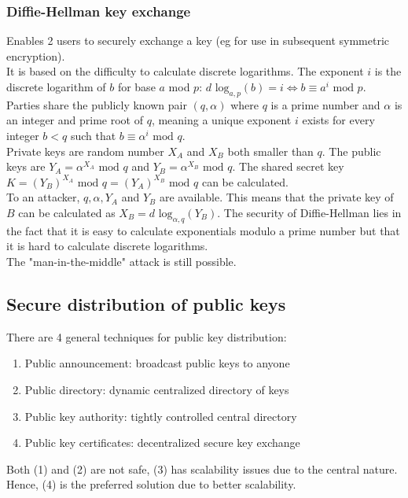 \documentclass[12pt]{article}
\begin{document}
 \subsubsection{Diffie-Hellman key exchange}
 Enables 2 users to securely exchange a key (eg for use in subsequent symmetric encryption).\\
 It is based on the difficulty to calculate discrete logarithms. The exponent $i$ is the discrete logarithm of $b$ for base $a$ mod $p$: $d\text{ log}_{a,p}(b)=i \Leftrightarrow b\equiv a^i\text{ mod }p$.\\
 Parties share the publicly known pair $(q,\alpha)$ where $q$ is a prime number and $\alpha$ is an integer and prime root of $q$, meaning a unique exponent $i$ exists for every integer $b<q$ such that $b\equiv\alpha^i\text{ mod }q$.\\
 Private keys are random number $X_A$ and $X_B$ both smaller than $q$. The public keys are $Y_A = \alpha^{X_A}\text{ mod }q$ and $Y_B = \alpha^{X_B}\text{ mod }q$. The shared secret key $K = (Y_B)^{X_A}\text{ mod }q = (Y_A)^{X_B}\text{ mod }q$ can be calculated.\\
 To an attacker, $q, \alpha, Y_A$ and $Y_B$ are available. This means that the private key of $B$ can be calculated as $X_B=d\text{ log}_{\alpha, q}(Y_B)$. The security of Diffie-Hellman lies in the fact that it is easy to calculate exponentials modulo a prime number but that it is hard to calculate discrete logarithms.\\
 The "man-in-the-middle" attack is still possible.
 
 \subsection{Secure distribution of public keys}
 There are 4 general techniques for public key distribution:
 \begin{enumerate}
 	\item Public announcement: broadcast public keys to anyone
 	\item Public directory: dynamic centralized directory of keys
 	\item Public key authority: tightly controlled central directory
 	\item Public key certificates: decentralized secure key exchange
 \end{enumerate}
Both (1) and (2) are not safe, (3) has scalability issues due to the central nature. Hence, (4) is the preferred solution due to better scalability.
 
\end{document}
